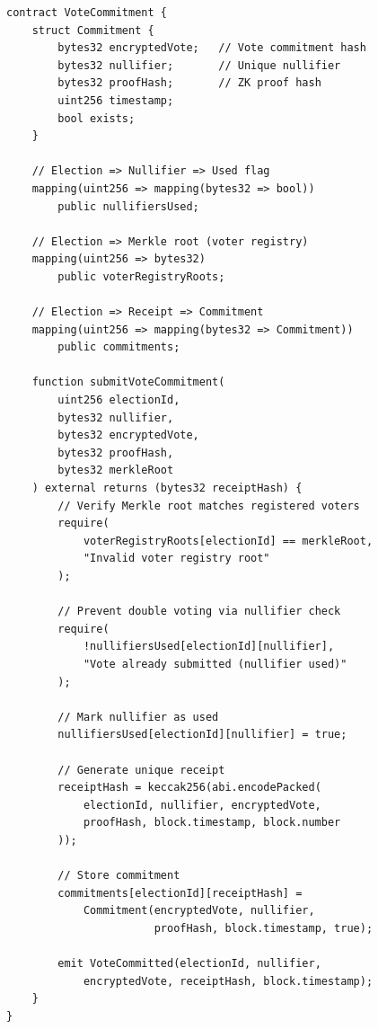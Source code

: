 \documentclass[conference]{IEEEtran}
\begin{document}
\begin{lstlisting}[style=solidity, caption={VoteCommitment with Nullifier-Based ZKP Verification}]
contract VoteCommitment {
    struct Commitment {
        bytes32 encryptedVote;   // Vote commitment hash
        bytes32 nullifier;       // Unique nullifier
        bytes32 proofHash;       // ZK proof hash
        uint256 timestamp;
        bool exists;
    }
    
    // Election => Nullifier => Used flag
    mapping(uint256 => mapping(bytes32 => bool)) 
        public nullifiersUsed;
    
    // Election => Merkle root (voter registry)
    mapping(uint256 => bytes32) 
        public voterRegistryRoots;
    
    // Election => Receipt => Commitment
    mapping(uint256 => mapping(bytes32 => Commitment)) 
        public commitments;
    
    function submitVoteCommitment(
        uint256 electionId,
        bytes32 nullifier,
        bytes32 encryptedVote,
        bytes32 proofHash,
        bytes32 merkleRoot
    ) external returns (bytes32 receiptHash) {
        // Verify Merkle root matches registered voters
        require(
            voterRegistryRoots[electionId] == merkleRoot,
            "Invalid voter registry root"
        );
        
        // Prevent double voting via nullifier check
        require(
            !nullifiersUsed[electionId][nullifier],
            "Vote already submitted (nullifier used)"
        );
        
        // Mark nullifier as used
        nullifiersUsed[electionId][nullifier] = true;
        
        // Generate unique receipt
        receiptHash = keccak256(abi.encodePacked(
            electionId, nullifier, encryptedVote,
            proofHash, block.timestamp, block.number
        ));
        
        // Store commitment
        commitments[electionId][receiptHash] = 
            Commitment(encryptedVote, nullifier,
                       proofHash, block.timestamp, true);
        
        emit VoteCommitted(electionId, nullifier,
            encryptedVote, receiptHash, block.timestamp);
    }
}
\end{lstlisting}
\end{document}
